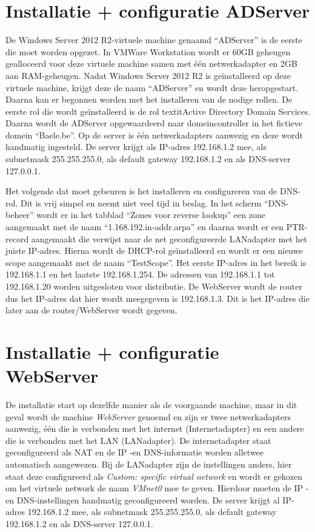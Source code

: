 \documentclass[pdftex,a4paper,12pt]{report}
\begin{document}
\section{Installatie + configuratie ADServer}
De Windows Server 2012 R2-virtuele machine genaamd "`ADServer"' is de eerste die moet worden opgezet. In VMWare Workstation wordt er 60GB geheugen gealloceerd voor deze virtuele machine samen met één netwerkadapter en 2GB aan RAM-geheugen. Nadat Windows Server 2012 R2 is geïnstalleerd op deze virtuele machine, krijgt deze de naam "`ADServer"' en wordt deze heropgestart. Daarna kan er begonnen worden met het installeren van de nodige rollen. De eerste rol die wordt geïnstalleerd is de rol textit{Active Directory Domain Services}. Daarna wordt de ADServer opgewaardeerd naar domeincontroller in het fictieve domein "`Baele.be"'. Op de server is één netwerkadapters aanwezig en deze wordt handmatig ingesteld. De server krijgt als IP-adres 192.168.1.2 mee, als subnetmask 255.255.255.0, als default gateway 192.168.1.2 en als DNS-server 127.0.0.1. \newline

Het volgende dat moet gebeuren is het installeren en configureren van de DNS-rol. Dit is vrij simpel en neemt niet veel tijd in beslag. In het scherm "`DNS-beheer"' wordt er in het tabblad "`Zones voor reverse lookup"' een zone aangemaakt met de naam "`1.168.192.in-addr.arpa"' en daarna wordt er een PTR-record aangemaakt die verwijst naar de net geconfigureerde LANadapter met het juiste IP-adres. Hierna wordt de DHCP-rol geïnstalleerd en wordt er een nieuwe scope aangemaakt met de naam "`TestScope"'. Het eerste IP-adres in het bereik is 192.168.1.1 en het laatste 192.168.1.254. De adressen van 192.168.1.1 tot 192.168.1.20 worden uitgesloten voor distributie. De WebServer wordt de router dus het IP-adres dat hier wordt meegegeven is 192.168.1.3. Dit is het IP-adres die later aan de router/WebServer wordt gegeven. \newline

\section{Installatie + configuratie WebServer}
De installatie start op dezelfde manier als de voorgaande machine, maar in dit geval wordt de machine \textit{WebServer} genoemd en zijn er twee netwerkadapters aanwezig, één die is verbonden met het internet (Internetadapter) en een andere die is verbonden met het LAN (LANadapter). De internetadapter staat geconfigureerd als NAT en de IP -en DNS-informatie worden alletwee automatisch aangewezen. Bij de LANadapter zijn de instellingen anders, hier staat deze configureerd als \textit{Custom: specific virtual network} en wordt er gekozen om het virtuele network de naam \textit{VMnet0} mee te geven. Hierdoor moeten de IP -en DNS-instellingen handmatig geconfigureerd worden. De server krijgt al IP-adres 192.168.1.2 mee, als subnetmask 255.255.255.0, als default gateway 192.168.1.2 en als DNS-server 127.0.0.1. \newline 
\end{document}
